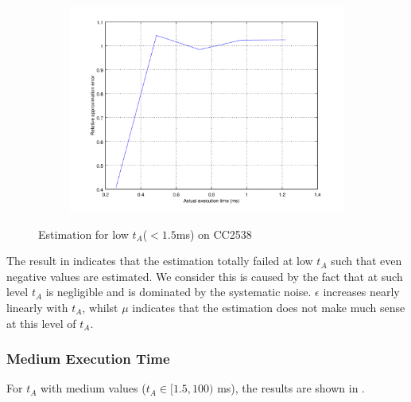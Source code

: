 \begin{figure}[ht!]
\begin{subfigure}{0.45\linewidth}
	\center
	\includegraphics[width=\linewidth]{fig/lowrtvtaerr.png}
	\end{subfigure}
	\caption{Estimation for low $t_A$($<1.5$ms) on CC2538}
	\label{Fig: Estimation for low tA}
\end{figure}

The result in  indicates that the estimation totally failed at low $t_A$ such that even negative values are estimated. We consider this is caused by the fact that at such level $t_A$ is negligible and is dominated by the systematic noise. $\epsilon$ increases nearly linearly with $t_A$, whilst $\mu$ indicates that the estimation does not make much sense at this level of $t_A$.

\subsubsection{Medium Execution Time}

For $t_A$ with medium values ($t_A \in[1.5, 100)$ ms), the results are shown in .


